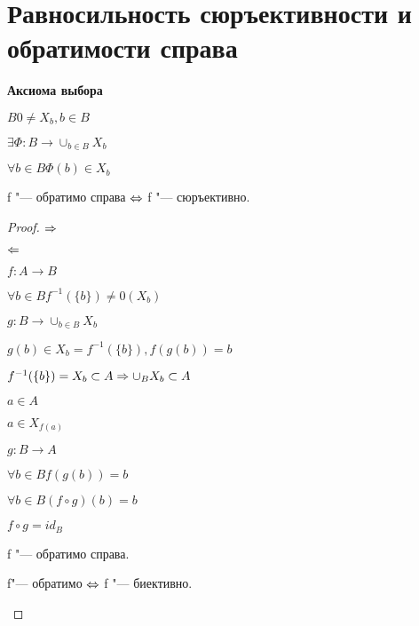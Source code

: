 ﻿\section{Равносильность сюръективности и обратимости справа}

{\bf Аксиома выбора}

$B 0 \ne X_b, b \in B$

$\exists \Phi: B \to \cup_{b \in B}X_b$

$\forall b \in B \Phi(b) \in X_{b}$

\begin{theorem}{}

f "--- обратимо справа $\Leftrightarrow$ f "--- сюръективно.

\end{theorem}

\begin{proof}
$\Rightarrow$

$\Leftarrow$

$f: A \to B$

$\forall b \in B f^{-1}(\{b\}) \ne 0(X_b)$

$g: B \to \cup_{b \in B}X_b$

$g(b) \in X_b = f^{-1}(\{b\}), f(g(b))= b$

$f^{-1}(\{b\}) = X_b \subset A \Rightarrow \cup_{B} X_b \subset A$

$a \in A$

$a \in X_{f(a)}$

$g: B \to A$

$\forall b \in B f(g(b)) = b$

$\forall b \in B (f \circ g)(b) = b$

$f \circ g = id_{B}$

f "--- обратимо справа.

\begin{conseq}{}

f"--- обратимо $\Leftrightarrow$ f "--- биективно.

\end{conseq}
\end{proof}